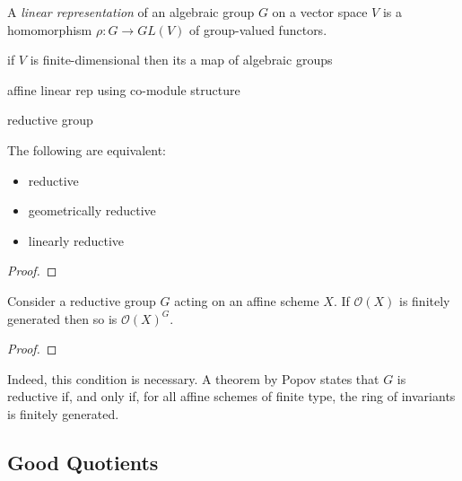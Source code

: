 \documentclass[12pt]{ociamthesis}  %
\begin{document}
\begin{definition}
  A \emph{linear representation} of an algebraic group $G$
  on a vector space $V$ is a homomorphism
  $\rho : G \to GL(V)$ of group-valued functors.
\end{definition}

\begin{example}
  if $V$ is finite-dimensional then its a map of algebraic groups
  \missingexample
\end{example}

\begin{example}
  affine linear rep using co-module structure
  \missingexample
\end{example}

\begin{definition}
  reductive group \missingdefinition
\end{definition}

\begin{theorem}
  The following are equivalent:
  \begin{itemize}
    \item reductive
    \item geometrically reductive
    \item linearly reductive
  \end{itemize}
  \begin{proof}
    \missingproof
  \end{proof}
\end{theorem}

\begin{example}
\end{example}

\begin{theorem}[Nagata]
  Consider a reductive group $G$ acting on an affine scheme $X$.
  If $\mathscr O(X)$ is finitely generated then so is $\mathscr O(X)^G$.
  \begin{proof}
    \missingproof
  \end{proof}
\end{theorem}

Indeed, this condition is necessary. A theorem by Popov \missingcitation
states that $G$ is reductive if, and only if, for all affine schemes of
finite type, the ring of invariants is finitely generated.

\missingsection

\subsection{Good Quotients}
\end{document}
